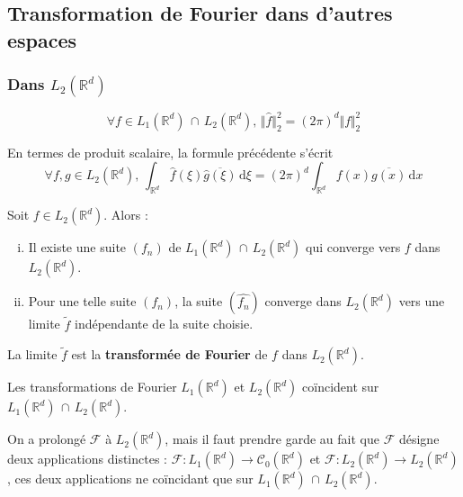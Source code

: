 	\subsection{Transformation de Fourier dans d'autres espaces}
	
	\subsubsection{Dans \texorpdfstring{$L_2(\mathbb{R}^d)$}{L₂(Rᵈ)}}
	
	
	\begin{theorem}
		\[ \forall f \in L_1(\mathbb{R}^d) \, \cap \, L_2(\mathbb{R}^d), \, \Vert \widehat{f} \Vert^2_2 = (2 \pi)^d \Vert f \Vert^2_2 \]
	\end{theorem}
	
	\begin{remark}
		En termes de produit scalaire, la formule précédente s'écrit
		\[ \forall f, g \in L_2(\mathbb{R}^d), \, \int_{\mathbb{R}^d} \widehat{f}(\xi) \overline{\widehat{g}(\xi)} \, \mathrm{d}\xi = (2 \pi)^d \int_{\mathbb{R}^d} f(x) \overline{g(x)} \, \mathrm{d}x \]
	\end{remark}
	
	\begin{theorem}
		Soit $f \in L_2(\mathbb{R}^d)$. Alors :
		\begin{enumerate}[(i)]
			\item Il existe une suite $(f_n)$ de $L_1(\mathbb{R}^d) \, \cap \, L_2(\mathbb{R}^d)$ qui converge vers $f$ dans $L_2(\mathbb{R}^d)$.
			\item Pour une telle suite $(f_n)$, la suite $(\widehat{f_n})$ converge dans $L_2(\mathbb{R}^d)$ vers une limite $\widetilde{f}$ indépendante de la suite choisie.
		\end{enumerate}
	\end{theorem}
	
	\begin{definition}
		La limite $\widetilde{f}$ est la \textbf{transformée de Fourier} de $f$ dans $L_2(\mathbb{R}^d)$.
	\end{definition}
	
	\begin{proposition}
		Les transformations de Fourier $L_1(\mathbb{R}^d)$ et $L_2(\mathbb{R}^d)$ coïncident sur $L_1(\mathbb{R}^d) \, \cap \, L_2(\mathbb{R}^d)$.
	\end{proposition}
	
	\begin{remark}
		On a prolongé $\mathcal{F}$ à $L_2(\mathbb{R}^d)$, mais il faut prendre garde au fait que $\mathcal{F}$ désigne deux applications distinctes : $\mathcal{F} : L_1(\mathbb{R}^d) \rightarrow \mathcal{C}_0(\mathbb{R}^d)$ et $\mathcal{F} : L_2(\mathbb{R}^d) \rightarrow L_2(\mathbb{R}^d)$, ces deux applications ne coïncidant que sur $L_1(\mathbb{R}^d) \, \cap \, L_2(\mathbb{R}^d)$.
	\end{remark}
	
